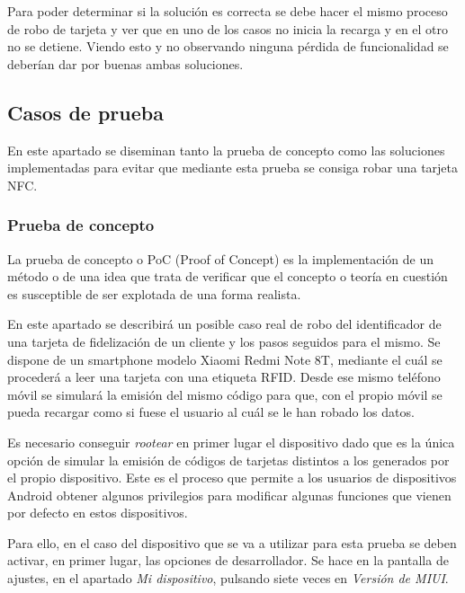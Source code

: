 \documentclass[12pt,a4paper,onecolumn,oneside]{report}
\begin{document}
Para poder determinar si la solución es correcta se debe hacer el mismo proceso de robo de tarjeta y ver que en uno de los casos no inicia la recarga y en el otro no se detiene. Viendo esto y no observando ninguna pérdida de funcionalidad se deberían dar por buenas ambas soluciones.

\subsection{Casos de prueba}

En este apartado se diseminan tanto la prueba de concepto como las soluciones implementadas para evitar que mediante esta prueba se consiga robar una tarjeta NFC.

\subsubsection{Prueba de concepto}
\label{Prueba de concepto}

La prueba de concepto o PoC (Proof of Concept) es la implementación de un método o de una idea que trata de verificar que el concepto o teoría en cuestión es susceptible de ser explotada de una forma realista.

En este apartado se describirá un posible caso real de robo del identificador de una tarjeta de fidelización de un cliente y los pasos seguidos para el mismo. Se dispone de un smartphone modelo Xiaomi Redmi Note 8T, mediante el cuál se procederá a leer una tarjeta con una etiqueta RFID. Desde ese mismo teléfono móvil se simulará la emisión del mismo código para que, con el propio móvil se pueda recargar como si fuese el usuario al cuál se le han robado los datos.

Es necesario conseguir \textit{rootear} en primer lugar el dispositivo dado que es la única opción de simular la emisión de códigos de tarjetas distintos a los generados por el propio dispositivo. Este es el proceso que permite a los usuarios de dispositivos Android obtener algunos privilegios para modificar algunas funciones que vienen por defecto en estos dispositivos.

Para ello, en el caso del dispositivo que se va a utilizar para esta prueba se deben activar, en primer lugar, las opciones de desarrollador. Se hace en la pantalla de ajustes, en el apartado \textit{Mi dispositivo}, pulsando siete veces en \textit{Versión de MIUI}.
\end{document}
